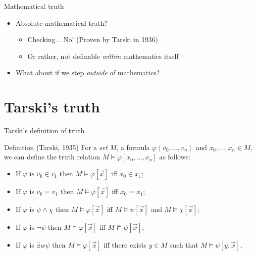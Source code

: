 \documentclass{beamer}
\begin{document}
\begin{frame}{Mathematical truth}
  \begin{itemize}
    \item Absolute mathematical truth?
    \begin{itemize}
      \item Checking... \pause No! (Proven by Tarski in 1936)\pause
      \item Or rather, not definable \textit{within} mathematics itself\pause
    \end{itemize}
    \item What about if we step \textit{outside} of mathematics?
  \end{itemize}
\end{frame}


\section{Tarski's truth}
\begin{frame}{Tarski's definition of truth}
  \pause\begin{block}{Definition (Tarski, 1935)}
    For a \textit{set} $M$, a formula $\varphi(v_0,\hdots,v_n)$ and $x_0,\hdots,x_n\in M$, we can define the truth relation $M\models\varphi[x_0,\hdots,x_n]$ as follows:
    \begin{itemize}
      \pause\item If $\varphi$ is $v_0\in v_1$ then $M\models\varphi[\vec x]$ iff $x_0\in x_1$;
      \pause\item If $\varphi$ is $v_0=v_1$ then $M\models\varphi[\vec x]$ iff $x_0=x_1$;
      \pause\item If $\varphi$ is $\psi\land\chi$ then $M\models\varphi[\vec x]$ iff $M\models\psi[\vec x]$ and $M\models\chi[\vec x]$;
      \pause\item If $\varphi$ is $\lnot\psi$ then $M\models\varphi[\vec x]$ iff $M\not\models\psi[\vec x]$;
      \pause\item If $\varphi$ is $\exists w\psi$ then $M\models\varphi[\vec x]$ iff there exists $y\in M$ such that $M\models\psi[y,\vec x]$.
    \end{itemize}
  \end{block}
  
  
\end{frame}
\end{document}

